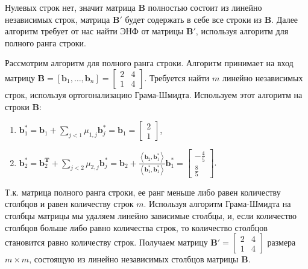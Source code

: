Нулевых строк нет, значит матрица $ \mathbf{B} $ полностью состоит из линейно независимых строк, матрица $ \mathbf{B}' $ будет содержать в себе все строки из $ \mathbf{B} $. Далее алгоритм требует от нас найти ЭНФ от матрицы $ \mathbf{B}' $, используя алгоритм для полного ранга строки.

Рассмотрим алгоритм для полного ранга строки. Алгоритм принимает на вход матрицу $ \mathbf{B} = \left[ \mathbf{b}_1, \ldots, \mathbf{b}_n \right] =
\left[ \begin{array}{cccc}
2 & 4 \\
1 & 4
\end{array} \right] $. Требуется найти $ m $ линейно независимых строк, используя ортогонализацию Грама-Шмидта. Используем этот алгоритм на строки $ \mathbf{B} $:

\begin{enumerate}

\item $ \mathbf{b}^*_1 = \mathbf{b}_1 + \sum\limits_{j < 1} \mu_{1, j}\mathbf{b}^*_j = \mathbf{b}_1 = \left[ \begin{array}{cccc}
2 \\ 
1 
\end{array}
\right]$,

\item $ \mathbf{b}^*_2 = \mathbf{b}^{\mathbf{T}}_2 + \sum\limits_{j < 2} \mu_{2, j}\mathbf{b}^*_j = \mathbf{b}_2 + \frac{\left\langle \mathbf{b}_2, \mathbf{b}^*_1 \right\rangle}{\left\langle \mathbf{b}^*_1, \mathbf{b}^*_1 \right\rangle} \mathbf{b}^*_1 = \left[ \begin{array}{cccc}
-\frac{4}{5} \\
\frac{8}{5}
\end{array}
\right]$.

\end{enumerate}

Т.к. матрица полного ранга строки, ее ранг меньше либо равен количеству столбцов и равен количеству строк $ m $. Используя алгоритм Грама-Шмидта на столбцы матрицы мы удаляем линейно зависимые столбцы, и, если количество столбцов больше либо равно количества строк, то количество столбцов становится равно количеству строк. Получаем матрицу $ \mathbf{B}' = \left[\begin{array}{cccc}
2 & 4 \\
1 & 4
\end{array}\right] $ размера $ m \times m $, состоящую из линейно независимых столбцов матрицы $ \mathbf{B} $.

